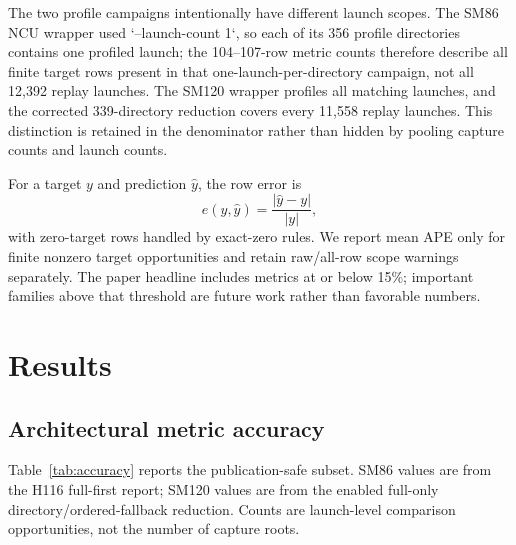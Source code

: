 \documentclass[10pt,letterpaper]{article}
\begin{document}
The two profile campaigns intentionally have different launch scopes.  The
SM86 NCU wrapper used `--launch-count 1`, so each of its 356 profile directories
contains one profiled launch; the 104--107-row metric counts therefore describe
all finite target rows present in that one-launch-per-directory campaign, not
all 12,392 replay launches.  The SM120 wrapper profiles all matching launches,
and the corrected 339-directory reduction covers every 11,558 replay launches.
This distinction is retained in the denominator rather than hidden by pooling
capture counts and launch counts.

For a target $y$ and prediction $\hat y$, the row error is
\[
  e(y,\hat y) = \frac{|\hat y-y|}{|y|},
\]
with zero-target rows handled by exact-zero rules.  We report mean APE only
for finite nonzero target opportunities and retain raw/all-row scope warnings
separately.  The paper headline includes metrics at or below 15\%; important
families above that threshold are future work rather than favorable numbers.

\section{Results}
\label{sec:results}

\subsection{Architectural metric accuracy}

Table~\ref{tab:accuracy} reports the publication-safe subset.  SM86 values are
from the H116 full-first report; SM120 values are from the enabled full-only
directory/ordered-fallback reduction.  Counts are launch-level comparison
opportunities, not the number of capture roots.
\end{document}
